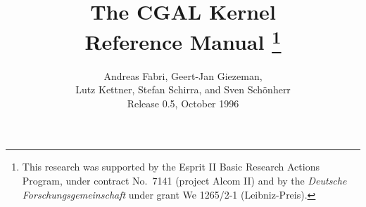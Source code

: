 
\title {{\Huge\bf The CGAL Kernel }\\
\vspace{3mm}
{\huge\bf  Reference Manual}
        \thanks{This research was supported by the {\sc Esprit} II Basic Research 
                Actions Program, under contract No.~7141 (project {\sc Alcom} II)
               and by the {\em Deutsche Forschungsgemeinschaft}
	under grant We 1265/2-1 (Leibniz-Preis).} }

\author{Andreas Fabri, Geert-Jan Giezeman,\\
        Lutz Kettner, Stefan Schirra, and Sven Sch\"onherr\\[2cm]
        Release 0.5, October 1996}


\date{}

\maketitle
{}

\setcounter{page}{0}
\cleardoublepage
\tableofcontents
